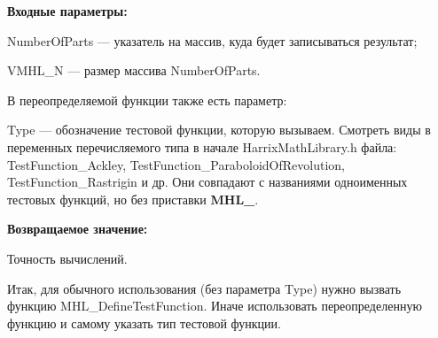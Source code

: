 \textbf{Входные параметры:}

NumberOfParts --- указатель на массив, куда будет записываться результат;

VMHL\_N --- размер массива NumberOfParts.

В переопределяемой функции также есть параметр:
  
Type --- обозначение тестовой функции, которую вызываем.
Смотреть виды в переменных перечисляемого типа в начале HarrixMathLibrary.h файла: TestFunction\_Ackley, TestFunction\_ParaboloidOfRevolution, TestFunction\_Rastrigin и др. Они совпадают с названиями одноименных тестовых функций, но без приставки \textbf{MHL\_}.

\textbf{Возвращаемое значение:}
 
Точность вычислений.

Итак, для обычного использования (без параметра Type) нужно вызвать функцию MHL\_DefineTestFunction. Иначе использовать переопределенную функцию и самому указать тип тестовой функции.